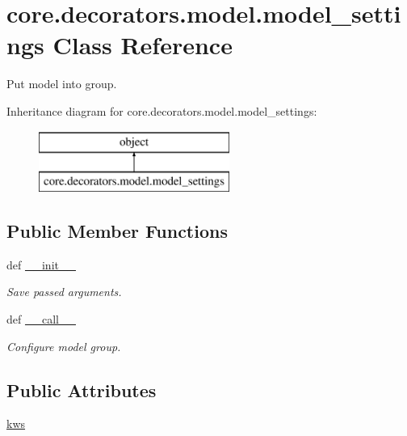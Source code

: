 \hypertarget{classcore_1_1decorators_1_1model_1_1model__settings}{\section{core.\-decorators.\-model.\-model\-\_\-settings Class Reference}
\label{classcore_1_1decorators_1_1model_1_1model__settings}
}


Put model into group.  


Inheritance diagram for core.\-decorators.\-model.\-model\-\_\-settings\-:\begin{figure}[H]
\begin{center}
\leavevmode
\includegraphics[height=2.000000cm]{classcore_1_1decorators_1_1model_1_1model__settings}
\end{center}
\end{figure}
\subsection*{Public Member Functions}
\begin{DoxyCompactItemize}
\item 
def \hyperlink{classcore_1_1decorators_1_1model_1_1model__settings_a4a8a0589d4e2138cb02f965f9ee0e9a6}{\-\_\-\-\_\-init\-\_\-\-\_\-}
\begin{DoxyCompactList}\small\item\em Save passed arguments. \end{DoxyCompactList}\item 
def \hyperlink{classcore_1_1decorators_1_1model_1_1model__settings_a080ab8817d1fe54b80144b77f8dfecc2}{\-\_\-\-\_\-call\-\_\-\-\_\-}
\begin{DoxyCompactList}\small\item\em Configure model group. \end{DoxyCompactList}\end{DoxyCompactItemize}
\subsection*{Public Attributes}
\begin{DoxyCompactItemize}
\item 
\hyperlink{classcore_1_1decorators_1_1model_1_1model__settings_af68f1c42015a9f9f117b36be9124c5ca}{kws}
\end{DoxyCompactItemize}


